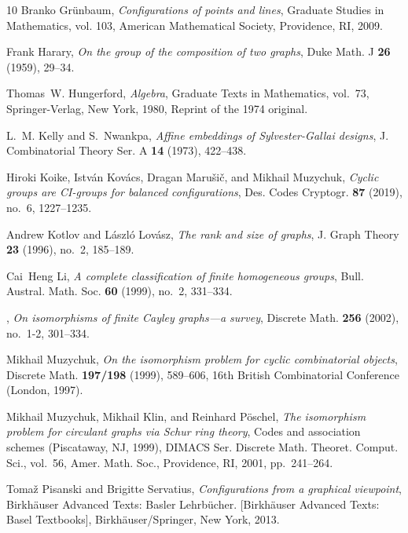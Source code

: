 \documentclass{amsart}
\theoremstyle{definition}
\theoremstyle{remark}
\numberwithin{equation}{section}
\begin{document}
\begin{thebibliography}{10}
Branko Gr{\"u}nbaum, \emph{Configurations of points and lines}, Graduate
  Studies in Mathematics, vol. 103, American Mathematical Society, Providence,
  RI, 2009. 

Frank Harary, \emph{On the group of the composition of two graphs}, Duke Math.
  J \textbf{26} (1959), 29--34. 

Thomas~W. Hungerford, \emph{Algebra}, Graduate Texts in Mathematics, vol.~73,
  Springer-Verlag, New York, 1980, Reprint of the 1974 original. 

L.~M. Kelly and S.~Nwankpa, \emph{Affine embeddings of {S}ylvester-{G}allai
  designs}, J. Combinatorial Theory Ser. A \textbf{14} (1973), 422--438.

Hiroki Koike, Istv\'{a}n Kov\'{a}cs, Dragan Maru\v{s}i\v{c}, and Mikhail
  Muzychuk, \emph{Cyclic groups are {CI}-groups for balanced configurations},
  Des. Codes Cryptogr. \textbf{87} (2019), no.~6, 1227--1235. 

Andrew Kotlov and L\'{a}szl\'{o} Lov\'{a}sz, \emph{The rank and size of
  graphs}, J. Graph Theory \textbf{23} (1996), no.~2, 185--189. 

Cai~Heng Li, \emph{A complete classification of finite homogeneous groups},
  Bull. Austral. Math. Soc. \textbf{60} (1999), no.~2, 331--334. 

\bysame, \emph{On isomorphisms of finite {C}ayley graphs---a survey}, Discrete
  Math. \textbf{256} (2002), no.~1-2, 301--334. 

Mikhail Muzychuk, \emph{On the isomorphism problem for cyclic combinatorial
  objects}, Discrete Math. \textbf{197/198} (1999), 589--606, 16th British
  Combinatorial Conference (London, 1997). 

Mikhail Muzychuk, Mikhail Klin, and Reinhard P{\"o}schel, \emph{The isomorphism
  problem for circulant graphs via {S}chur ring theory}, Codes and association
  schemes ({P}iscataway, {NJ}, 1999), DIMACS Ser. Discrete Math. Theoret.
  Comput. Sci., vol.~56, Amer. Math. Soc., Providence, RI, 2001, pp.~241--264.

Toma\v{z} Pisanski and Brigitte Servatius, \emph{Configurations from a
  graphical viewpoint}, Birkh\"{a}user Advanced Texts: Basler Lehrb\"{u}cher.
  [Birkh\"{a}user Advanced Texts: Basel Textbooks], Birkh\"{a}user/Springer,
  New York, 2013. 


\end{thebibliography}
\end{document}

